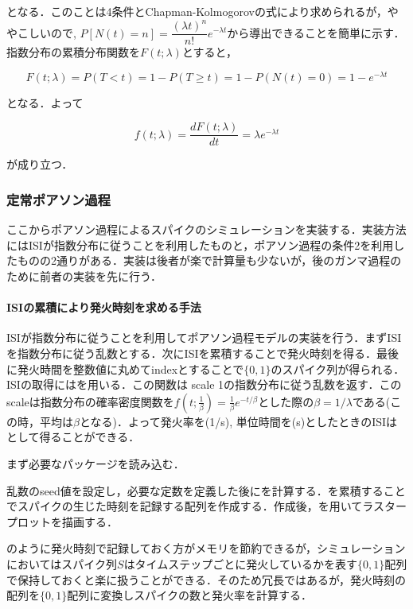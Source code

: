 となる．このことは4条件とChapman-Kolmogorovの式により求められるが，ややこしいので, $P[N(t)=n]=\dfrac{(\lambda t)^{n}}{n !} e^{-\lambda t}$から導出できることを簡単に示す．指数分布の累積分布関数を$F(t; \lambda)$とすると，


\begin{equation}
F(t; \lambda) = P(T< t)=1-P(T\geq t)=1-P(N(t)=0)=1-e^{-\lambda t}
\end{equation}


となる．よって


\begin{equation}
f(t; \lambda)=\frac{dF(t; \lambda)}{dt}=\lambda e^{-\lambda t}
\end{equation}


が成り立つ．
\subsubsection{定常ポアソン過程}
ここからポアソン過程によるスパイクのシミュレーションを実装する．実装方法にはISIが指数分布に従うことを利用したものと，ポアソン過程の条件2を利用したものの2通りがある．実装は後者が楽で計算量も少ないが，後のガンマ過程のために前者の実装を先に行う．

\paragraph{ISIの累積により発火時刻を求める手法}
ISIが指数分布に従うことを利用してポアソン過程モデルの実装を行う．まずISIを指数分布に従う乱数とする．次にISIを累積することで発火時刻を得る．最後に発火時間を整数値に丸めてindexとすることで$\{0, 1\}$のスパイク列が得られる．ISIの取得にはを用いる．この関数は scale 1の指数分布に従う乱数を返す．このscaleは指数分布の確率密度関数を$f(t; \frac{1}{\beta}) = \frac{1}{\beta} e^{-t/\beta}$とした際の$\beta = 1/\lambda$である(この時，平均は$\beta$となる)．よって発火率を(1/s), 単位時間を(s)としたときのISIは として得ることができる．

まず必要なパッケージを読み込む．

乱数のseed値を設定し，必要な定数を定義した後にを計算する．を累積することでスパイクの生じた時刻を記録する配列を作成する．作成後，を用いてラスタープロットを描画する．



のように発火時刻で記録しておく方がメモリを節約できるが，シミュレーションにおいてはスパイク列$S$はタイムステップごとに発火しているかを表す$\{0,1\}$配列で保持しておくと楽に扱うことができる．そのため冗長ではあるが，発火時刻の配列を$\{0,1\}$配列に変換しスパイクの数と発火率を計算する．

